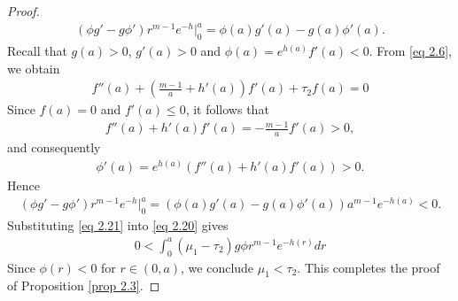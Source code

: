 \documentclass[10pt,a4paper]{amsart}
\begin{document}
\begin{proof}
\begin{align*}
    (\phi g'-g\phi')r^{m-1}e^{-h}\Big|_{0}^{a}=\phi(a)g'(a)-g(a)\phi'(a).
\end{align*}
Recall that  $g(a)>0$, $g' (a)>0$ and $\phi(a)=e^{h(a)}f'(a)<0$. From \eqref{eq 2.6}, we obtain  
\begin{align*}
    f''(a)+(\frac{m-1}{a}+h'(a))f'(a)+\tau_{2}f(a)=0
\end{align*}
Since $f(a)=0$ and $f'(a)\leq 0$, it follows that
\begin{align*}
    f''(a)+h'(a)f'(a)=-\frac{m-1}{a}f'(a)> 0,
\end{align*}
and consequently
\begin{align*}
    \phi'(a)=e^{h(a)}(f''(a)+h'(a)f'(a))> 0.
\end{align*}
Hence
\begin{align}\label{eq 2.21}
    (\phi g'-g\phi')r^{m-1}e^{-h}\Big|_{0}^{a}= (\phi(a) g'(a)-g(a)\phi'(a))a^{m-1}e^{-h(a)}< 0.
\end{align}
Substituting  \eqref{eq 2.21} into  \eqref{eq 2.20} gives
\begin{align*}
    0< \int_{0}^{a}(\mu_{1}-\tau_{2})g\phi r^{m-1}e^{-h(r)}dr
\end{align*}
Since $\phi(r)<0$ for $r\in (0,a)$, we conclude $ \mu_{1}< \tau_{2}$. This completes  the proof of  Proposition  \ref{prop 2.3}.
\end{proof}
\end{document}
